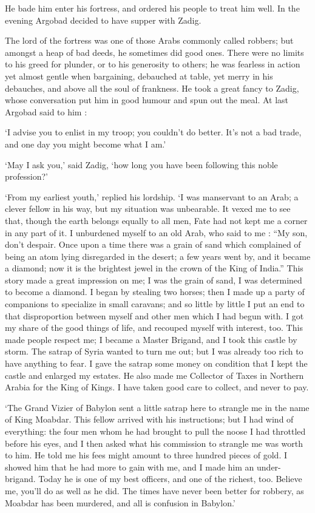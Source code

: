 \documentclass{article}
\begin{document}
\begin{center}
He bade him enter his fortress, and ordered his people to treat him well. In the 
evening Argobad decided to have supper with Zadig. 

The lord of the fortress was one of those Arabs commonly called robbers; but amongst 
a heap of bad deeds, he sometimes did good ones. There were no limits to his greed 
for plunder, or to his generosity to others; he was fearless in action yet almost 
gentle when bargaining, debauched at table, yet merry in his debauches, and above 
all the soul of frankness. He took a great fancy to Zadig, whose conversation put 
him in good humour and spun out the meal. At last Argobad said to him : 

`I advise you to enlist in my troop; you couldn't do better. It's not a bad trade, 
and one day you might become what I am.' 

`May I ask you,' said Zadig, `how long you have been following this noble profession?' 

`From my earliest youth,' replied his lordship. `I was manservant to an Arab; a 
clever fellow in his way, but my situation was unbearable. It vexed me to see that, 
though the earth belongs equally to all men, Fate had not kept me a corner in any 
part of it. I unburdened myself to an old Arab, who said to me : ``My son, don't 
despair. Once upon a time there was a grain of sand which complained of being an 
atom lying disregarded in the desert; a few years went by, and it became a diamond; 
now it is the brightest jewel in the crown of the King of India.'' This story made 
a great impression on me; I was the grain of sand, I was determined to become a 
diamond. I began by stealing two horses; then I made up a party of companions to 
specialize in small caravans; and so little by little I put an end to that disproportion 
between myself and other men which I had begun with. I got my share of the good 
things of life, and recouped myself with interest, too. This made people respect 
me; I became a Master Brigand, and I took this castle by storm. The satrap of Syria 
wanted to turn me out; but I was already too rich to have anything to fear. I gave 
the satrap some money on condition that I kept the castle and enlarged my estates. 
He also made me Collector of Taxes in Northern Arabia for the King of Kings. I 
have taken good care to collect, and never to pay. 

`The Grand Vizier of Babylon sent a little satrap here to strangle me in the name 
of King Moabdar. This fellow arrived with his instructions; but I had wind of everything: 
the four men whom he had brought to pull the noose I had throttled before his eyes, 
and I then asked what his commission to strangle me was worth to him. He told me 
his fees might amount to three hundred pieces of gold. I showed him that he had 
more to gain with me, and I made him an under-brigand. Today he is one of my best 
officers, and one of the richest, too. Believe me, you'll do as well as he did. 
The times have never been better for robbery, as Moabdar has been murdered, and 
all is confusion in Babylon.' 


\end{center}
\end{document}

